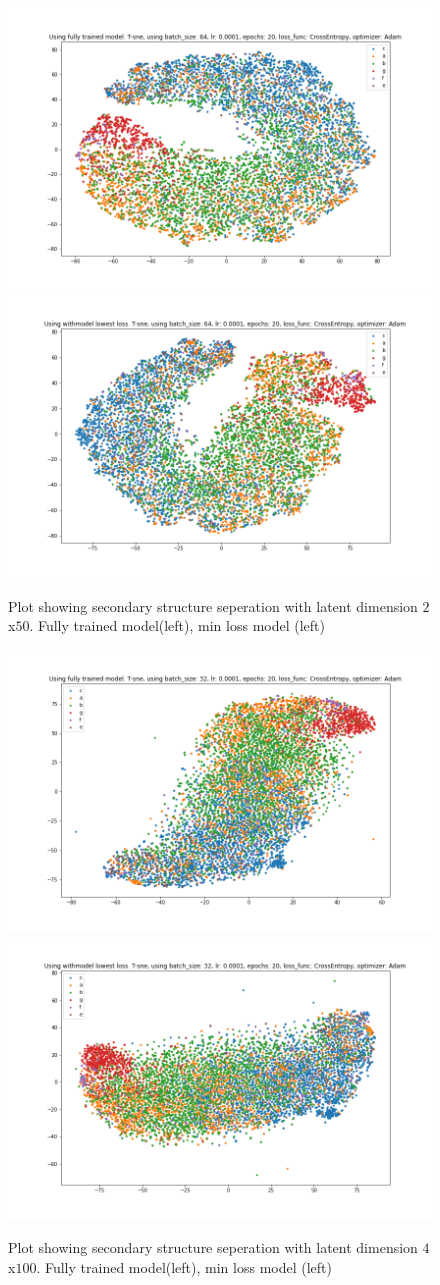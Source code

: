 \begin{figure}[!ht]
  \centering
  \includegraphics[width=0.4\linewidth]{latex/imgs/last_50.png}
  \includegraphics[width=0.4\linewidth]{latex/imgs/best_50.png}
  \caption{Plot showing secondary structure seperation with latent dimension $2$x$50$. Fully trained model(left), min loss model (left)}
  \label{fig:plot_50}
\end{figure}

\begin{figure}[!ht]
  \centering
  \includegraphics[width=0.4\linewidth]{latex/imgs/last_100.png}
  \includegraphics[width=0.4\linewidth]{latex/imgs/best_100.png}
  \caption{Plot showing secondary structure seperation with latent dimension $4$x$100$. Fully trained model(left), min loss model (left)}
  \label{fig:plot_100}
\end{figure}

